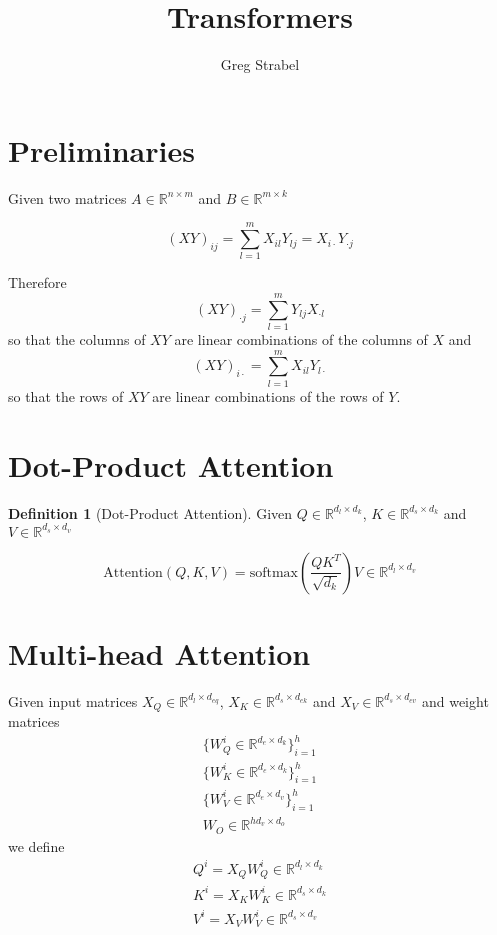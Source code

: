 \documentclass[11pt]{article}
\author{Greg Strabel}
\title{Transformers}
\theoremstyle{definition}
\newtheorem{definition}{Definition}[section]
\begin{document}
\maketitle

\section{Preliminaries}

Given two matrices $A \in \mathbb{R}^{n \times m}$ and $B \in \mathbb{R}^{m \times k}$

\begin{equation}
\left( XY \right)_{ij} = \sum_{l=1}^m X_{il}Y_{lj} = X_{i \cdot} Y_{\cdot j}
\end{equation}

Therefore
\begin{equation}
\left( XY \right)_{\cdot j} = \sum_{l=1}^m Y_{lj} X_{\cdot l}
\end{equation}
so that the columns of $XY$ are linear combinations of the columns of $X$ and
\begin{equation}
\left( XY \right)_{i \cdot} = \sum_{l=1}^m X_{il} Y_{l \cdot}
\end{equation}
so that the rows of $XY$ are linear combinations of the rows of $Y$.

\section{Dot-Product Attention}

\begin{definition}[Dot-Product Attention] Given $Q \in \mathbb{R}^{d_l \times d_k}$, $K \in \mathbb{R}^{d_s \times d_k}$ and $V \in \mathbb{R}^{d_s \times d_v}$

\begin{equation}
\mathrm{Attention} \left( Q,K,V \right) = \mathrm{softmax} \left( \frac{QK^T}{\sqrt{d_k}} \right) V \in \mathbb{R}^{d_l \times d_v}
\end{equation}
\end{definition}

\section{Multi-head Attention}
Given input matrices $X_Q \in \mathbb{R}^{d_l \times d_{eq}}$, $X_K \in \mathbb{R}^{d_s \times d_{ek}}$ and $X_V \in \mathbb{R}^{d_s \times d_{ev}}$ and weight matrices
\begin{gather}
\nonumber \{W_Q^i \in \mathbb{R}^{d_e \times d_k} \}_{i=1}^h \\
\{W_K^i \in \mathbb{R}^{d_e \times d_k} \}_{i=1}^h \\
\nonumber \{W_V^i \in \mathbb{R}^{d_e \times d_v} \}_{i=1}^h \\
W_O \in \mathbb{R}^{hd_v \times d_o}
\end{gather}
we define
\begin{gather}
\nonumber Q^i = X_QW_Q^i \in \mathbb{R}^{d_l \times d_k} \\
K^i = X_KW_K^i \in \mathbb{R}^{d_s \times d_k} \\
\nonumber V^i = X_VW_V^i \in \mathbb{R}^{d_s \times d_v}
\end{gather}
\end{document}
